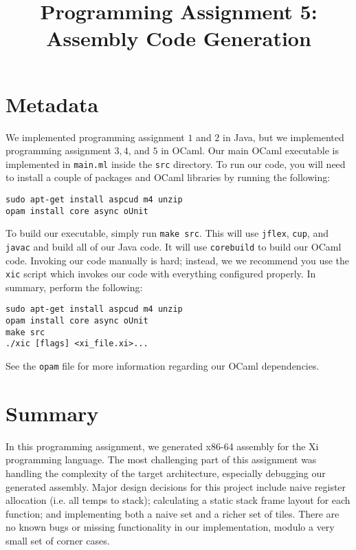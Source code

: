 \documentclass{hw}
\title{Programming Assignment 5:\\ Assembly Code Generation}
\begin{document}
\maketitle

\section{Metadata}\label{sec:metadata}
We implemented programming assignment $1$ and $2$ in Java, but we implemented
programming assignment $3,4$, and $5$ in OCaml. Our main OCaml executable is
implemented in \texttt{main.ml} inside the \texttt{src} directory. To run our
code, you will need to install a couple of packages and OCaml libraries by
running the following:

\begin{center}
\begin{BVerbatim}
sudo apt-get install aspcud m4 unzip
opam install core async oUnit
\end{BVerbatim}
\end{center}

To build our executable, simply run \texttt{make src}. This will use
\texttt{jflex}, \texttt{cup}, and \texttt{javac} and build all of our Java
code. It will use \texttt{corebuild} to build our OCaml code. Invoking our
code manually is hard; instead, we we recommend you use the \texttt{xic} script
which invokes our code with everything configured properly. 
In summary, perform the following:

\begin{center}
\begin{BVerbatim}
sudo apt-get install aspcud m4 unzip
opam install core async oUnit
make src
./xic [flags] <xi_file.xi>...
\end{BVerbatim}
\end{center}

See the \texttt{opam} file for more information regarding our OCaml dependencies.


\section{Summary}\label{sec:summary}
In this programming assignment, we generated x86-64 assembly for the Xi programming language.
The most challenging part of this assignment was handling the complexity of the target
architecture, especially debugging our generated assembly. Major design decisions for this
project include naive register allocation (i.e. all temps to stack); calculating a static
stack frame layout for each function; and implementing both a naive set and a richer set of
tiles. There are no known bugs or missing functionality in our implementation, modulo a very
small set of corner cases.
\end{document}
